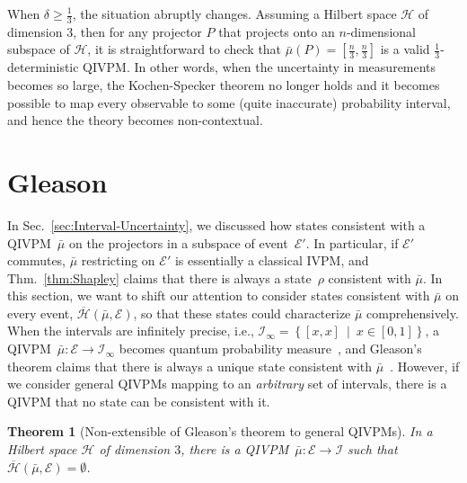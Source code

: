 \documentclass[english,reprint, aps, prl,superscriptaddress, showpacs,
showkeys, longbibliography, amsmath, amssymb, floatfix]{revtex4-1}
\theoremstyle{plain}
\newtheorem{thm}{Theorem}
\theoremstyle{definition}
\newcommand{\Hilb}{\mathcal{H}}
\newcommand{\events}{\ensuremath{\mathcal{E}}}
\newcommand{\set}[2]{\ensuremath{\left\{ {#1}~\middle|~{#2}\right\} }}
\newcommand{\coreBorn}{\ensuremath{\overline{\Hilb}}}
\begin{document}
When $\delta \ge \frac{1}{3}$, the situation abruptly
changes. Assuming a Hilbert space $\Hilb$ of dimension $3$, then for
any projector $P$ that projects onto an $n$-dimensional subspace of
$\Hilb$, it is straightforward to check that
$\bar{\mu}\left(P\right)=\left[\frac{n}{3},\frac{n}{3}\right]$ is a valid
$\frac{1}{3}$-deterministic QIVPM. In other words, when the
uncertainty in measurements becomes so large, the Kochen-Specker
theorem no longer holds and it becomes possible to map every
observable to some (quite inaccurate) probability interval, and hence
the theory becomes non-contextual.

\section{Gleason}

\label{sec:Gleason}

In Sec.~\ref{sec:Interval-Uncertainty}, we discussed how states
consistent with a QIVPM~$\bar{\mu}$ on the projectors in a subspace
of event~$\events'$. In particular, if $\events'$ commutes, $\bar{\mu}$
restricting on $\events'$ is essentially a classical IVPM, and Thm.~\ref{thm:Shapley}
claims that there is always a state~$\rho$ consistent with $\bar{\mu}$.
In this section, we want to shift our attention to consider states
consistent with $\bar{\mu}$ on every event, $\coreBorn\left(\bar{\mu},\events\right)$,
so that these states could characterize $\bar{\mu}$ comprehensively.
When the intervals are infinitely precise, i.e., $\mathscr{I}_{\infty}=\set{\left[x,x\right]}{x\in\left[0,1\right]}$,
a QIVPM~$\bar{\mu}:\events\rightarrow\mathscr{I}_{\infty}$ becomes
quantum probability measure~\citep{HOSTunpublished}, and Gleason's
theorem claims that there is always a unique state consistent with
$\bar{\mu}$~\citep{gleason1957,Redhead1987-REDINA,peres1995quantum}.
However, if we consider general QIVPMs mapping to an \emph{arbitrary}
set of intervals, there is a QIVPM that no state can be consistent
with it.

\begin{thm}[Non-extensible of Gleason's theorem to general QIVPMs]\label{thm:Non-extensible-of-Gleason's}In
a Hilbert space $\Hilb$ of dimension $3$, there is a QIVPM~$\bar{\mu}:\events\rightarrow\mathscr{I}$
such that $\coreBorn\left(\bar{\mu},\events\right)=\emptyset$.\end{thm}
\end{document}
